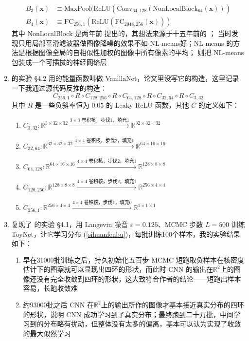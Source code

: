 \documentclass[11pt]{article}
\begin{document}
\begin{enumerate}
\[\begin{split}
B_3(\mathbf{x})&\equiv \text{MaxPool}(\text{ReLU}(\text{Conv}_{64,128}(\text{NonLocalBlock}_{64}(\mathbf{x})))\\
B_4(\mathbf{x})&\equiv \text{FC}_{256,1}(\text{ReLU}(\text{FC}_{2048,256}(\mathbf{x})))
\end{split}
\]其中 NonLocalBlock 是两年前 \cite{wang2018non} 提出的，其想法来源于十五年前的 \cite{buades2005non}；\cite{buades2005non} 当时发现只用局部平滑滤波器做图像降噪的效果不如 NL-means好；NL-means 的方法是根据图像全局的自相似性加权的图像中所有像素的平均；\cite{wang2018non} 则把 NL-means 包装成一个可插拔的神经网络层
\item \cite{nijkamp2019anatomy} 的实验 \S4.2 用的能量函数叫做 VanillaNet，论文里没写它的构造，这里记录一下我通过源代码反推的构造：\[
C_{256,1} \circ R \circ C_{128,256} \circ R \circ C_{64,128} \circ R \circ C_{32,64} \circ R \circ C_{3,32}
\]其中 $R$ 是一些负斜率恒为 $0.05$ 的 Leaky ReLU 函数，其他 $C$ 的定义如下：
\begin{enumerate}
\item $C_{3,32}:\mathbb{R}^{3\times32\times32}\xrightarrow{3\times3\text{ 卷积核，步伐1，填充1}}\mathbb{R}^{32\times32\times32}$
\item $C_{32,64}:\mathbb{R}^{32\times32\times32}\xrightarrow{4\times4\text{ 卷积核，步伐2，填充1}}\mathbb{R}^{64\times16\times16}$
\item $C_{64,128}:\mathbb{R}^{64\times16\times16}\xrightarrow{4\times4\text{ 卷积核，步伐2，填充1}}\mathbb{R}^{128\times8\times8}$
\item $C_{128,256}:\mathbb{R}^{128\times8\times8}\xrightarrow{4\times4\text{ 卷积核，步伐2，填充1}}\mathbb{R}^{256\times4\times4}$
\item $C_{256,1}:\mathbb{R}^{256\times4\times4}\xrightarrow{4\times4\text{ 卷积核，步伐1，填充0}}\mathbb{R}^{1\times1\times1}$
\end{enumerate}
\item 复现了 \cite{nijkamp2019anatomy} 的实验 \S4.1，用 Langevin 噪音 $\varepsilon=0.125$、MCMC 步数 $L=500$ 训练 ToyNet，让它学习分布 (\ref{sihuanfenbu})，每批训练100个样本，我的实验结果如下：
\begin{enumerate}
\item 早在31000批训练之后，持久初始化五百步 MCMC 短跑取负样本在核密度估计下的图案就可以显现出四环的形状，而此时 CNN 的输出在$\mathbb{R}^2$上的图像还没有完全收敛到四环的形状，这大致符合作者的结论——短跑出样本容易，长跑收敛难
\item 约93000批之后 CNN 在$\mathbb{R}^2$上的输出所作的图像才基本接近真实分布的四环的形状，说明 CNN 成功学习到了真实分布；最终跑到二十万批，中间学习到的分布略有扰动，但整体没有太多的偏离，基本可以认为实现了收敛的最大似然学习

\end{enumerate}
\end{enumerate}
\end{document}

